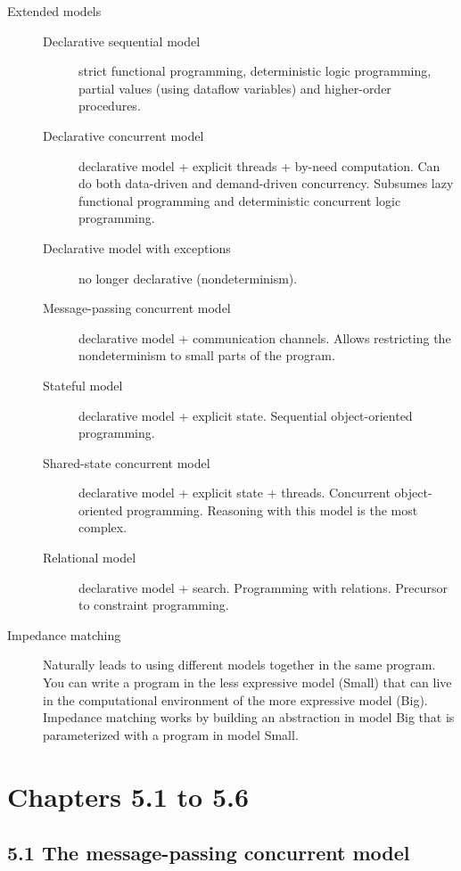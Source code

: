 \begin{description}
  \item[Extended models]
    \begin{description}
      \item[Declarative sequential model] strict functional programming, deterministic logic programming, partial values (using dataflow variables) and higher-order procedures.
      \item[Declarative concurrent model] declarative model + explicit threads + by-need computation.
        Can do both data-driven and demand-driven concurrency.
        Subsumes lazy functional programming and deterministic concurrent logic programming.
      \item[Declarative model with exceptions] no longer declarative (nondeterminism).
      \item[Message-passing concurrent model] declarative model + communication channels.
        Allows restricting the nondeterminism to small parts of the program.
      \item[Stateful model] declarative model + explicit state.
        Sequential object-oriented programming.
      \item[Shared-state concurrent model] declarative model + explicit state + threads.
        Concurrent object-oriented programming.
        Reasoning with this model is the most complex.
      \item[Relational model] declarative model + search.
        Programming with relations.
        Precursor to constraint programming.
    \end{description}

  \item[Impedance matching] Naturally leads to using different models together in the same program.
    You can write a program in the less expressive model (Small) that can live in the computational environment of the more expressive model (Big).
    Impedance matching works by building an abstraction in model Big that is parameterized with a program in model Small.
\end{description}

\section{Chapters 5.1 to 5.6}

\subsection{5.1 The message-passing concurrent model}

